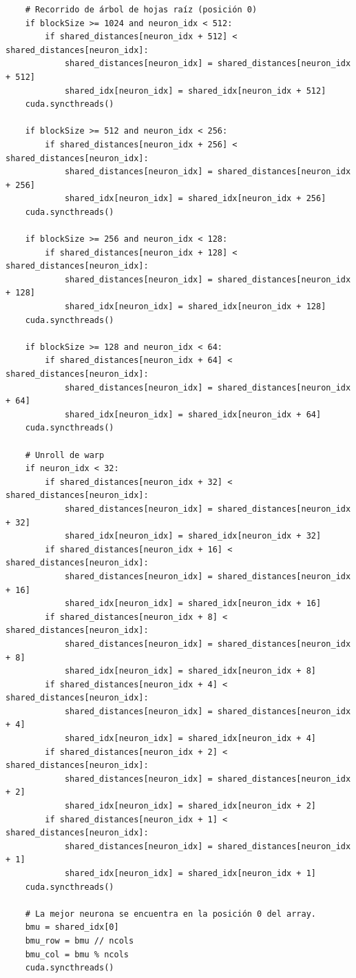 \begin{code}
\begin{verbatim}
    # Recorrido de árbol de hojas raíz (posición 0)
    if blockSize >= 1024 and neuron_idx < 512:
        if shared_distances[neuron_idx + 512] < shared_distances[neuron_idx]:
            shared_distances[neuron_idx] = shared_distances[neuron_idx + 512]
            shared_idx[neuron_idx] = shared_idx[neuron_idx + 512]
    cuda.syncthreads()
    
    if blockSize >= 512 and neuron_idx < 256:
        if shared_distances[neuron_idx + 256] < shared_distances[neuron_idx]:
            shared_distances[neuron_idx] = shared_distances[neuron_idx + 256]
            shared_idx[neuron_idx] = shared_idx[neuron_idx + 256]
    cuda.syncthreads()
    
    if blockSize >= 256 and neuron_idx < 128:
        if shared_distances[neuron_idx + 128] < shared_distances[neuron_idx]:
            shared_distances[neuron_idx] = shared_distances[neuron_idx + 128]
            shared_idx[neuron_idx] = shared_idx[neuron_idx + 128]
    cuda.syncthreads()
    
    if blockSize >= 128 and neuron_idx < 64:
        if shared_distances[neuron_idx + 64] < shared_distances[neuron_idx]:
            shared_distances[neuron_idx] = shared_distances[neuron_idx + 64]
            shared_idx[neuron_idx] = shared_idx[neuron_idx + 64]
    cuda.syncthreads()
    
    # Unroll de warp
    if neuron_idx < 32:
        if shared_distances[neuron_idx + 32] < shared_distances[neuron_idx]:
            shared_distances[neuron_idx] = shared_distances[neuron_idx + 32]
            shared_idx[neuron_idx] = shared_idx[neuron_idx + 32]
        if shared_distances[neuron_idx + 16] < shared_distances[neuron_idx]:
            shared_distances[neuron_idx] = shared_distances[neuron_idx + 16]
            shared_idx[neuron_idx] = shared_idx[neuron_idx + 16]
        if shared_distances[neuron_idx + 8] < shared_distances[neuron_idx]:
            shared_distances[neuron_idx] = shared_distances[neuron_idx + 8]
            shared_idx[neuron_idx] = shared_idx[neuron_idx + 8]
        if shared_distances[neuron_idx + 4] < shared_distances[neuron_idx]:
            shared_distances[neuron_idx] = shared_distances[neuron_idx + 4]
            shared_idx[neuron_idx] = shared_idx[neuron_idx + 4]
        if shared_distances[neuron_idx + 2] < shared_distances[neuron_idx]:
            shared_distances[neuron_idx] = shared_distances[neuron_idx + 2]
            shared_idx[neuron_idx] = shared_idx[neuron_idx + 2]
        if shared_distances[neuron_idx + 1] < shared_distances[neuron_idx]:
            shared_distances[neuron_idx] = shared_distances[neuron_idx + 1]
            shared_idx[neuron_idx] = shared_idx[neuron_idx + 1]
    cuda.syncthreads()
    
    # La mejor neurona se encuentra en la posición 0 del array.
    bmu = shared_idx[0]
    bmu_row = bmu // ncols
    bmu_col = bmu % ncols
    cuda.syncthreads()
\end{verbatim}
\label{code:somiter2}
\end{code}

